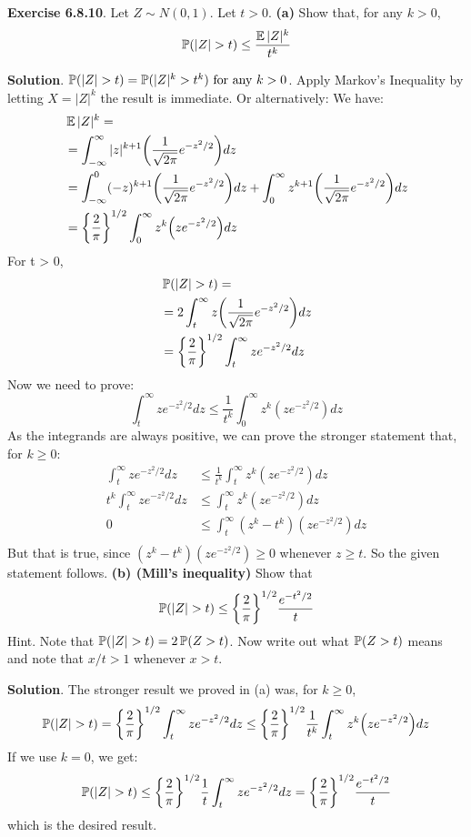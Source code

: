 \textbf{Exercise 6.8.10}. Let \(Z \sim N(0, 1)\). Let \(t > 0\).
\textbf{(a)} Show that, for any \(k > 0\),
\[
\operatorname{\mathbb{P}}(|Z| > t) \leq \frac{\operatorname{\mathbb{E}}|Z|^{k}}{t^{k}}
\]

\textbf{Solution}.
\(\PROB (|Z| > t) = \PROB
(| Z|^{k} > t^{k}) $ for any \(k > 0\).
Apply Markov's Inequality by letting \(X = |Z|^{k}\) the result is
immediate. Or alternatively:
We have:
\begin{align*}
&\EXP|Z|^{k} = \\
&= \int _{-\infty}^{\infty} |z|^{k+1}\left( \frac{1}{\sqrt{2\pi}} e^{-z^{2}/2} \right) dz \\
&= \int _{-\infty}^{0} (-z)^{k+1}\left( \frac{1}{\sqrt{2\pi}} e^{-z^{2}/2} \right) dz
  + \int _{0}^{\infty} z^{k+1}\left( \frac{1}{\sqrt{2\pi}} e^{-z^{2}/2} \right) dz \\
&=  \left\{ \frac{2}{\pi} \right\}^{1/2} \int _{0}^{\infty} z^{k} \left( z e^{-z^{2}/2} \right) dz
\end{align*}
For t > 0,
\begin{align*}
&\PROB(|Z| > t) = \\
&= 2 \int _t^{\infty} z\left( \frac{1}{\sqrt{2\pi}} e^{-z^{2}/2} \right) dz \\
&= \left\{ \frac{2}{\pi} \right\}^{1/2} \int _t^{\infty} z e^{-z^{2}/2} dz
\end{align*}
Now we need to prove:
\[
\int _t^{\infty} z e^{-z^{2}/2} dz \leq \frac{1}{t^{k}}\int _{0}^{\infty} z^{k} \left( z e^{-z^{2}/2} \right) dz
\]
As the integrands are always positive, we can prove the stronger
statement that, for \(k \geq 0\):
\begin{align*}
\int _t^{\infty} z e^{-z^{2}/2} dz & \leq \frac{1}{t^{k}}\int _{t}^{\infty} z^{k} \left( z e^{-z^{2}/2} \right) dz  \\
t^{k} \int _t^{\infty} z e^{-z^{2}/2} dz & \leq \int _{t}^{\infty} z^{k} \left( z e^{-z^{2}/2} \right) dz  \\
0 & \leq \int _{t}^{\infty} (z^{k} - t^{k}) \left( z e^{-z^{2}/2} \right) dz  \\
\end{align*}
But that is true, since \((z^{k} - t^{k}) (z e^{-z^{2}/2}) \geq 0\) whenever
\(z \geq t\). So the given statement follows.
\textbf{(b) (Mill's inequality)} Show that
\[
\PROB(|Z| > t) \leq \left\{ \frac{2}{\pi} \right\}^{1/2} \frac{e^{-t^{2}/2}}{t}
\]
Hint. Note that \(\operatorname{\mathbb{P}}(|Z| > t) = 2\operatorname{\mathbb{P}}(Z > t)\). Now write
out what \(\operatorname{\mathbb{P}}(Z > t)\) means and note that \(x/t > 1\) whenever
\(x > t\).

\textbf{Solution}.
The stronger result we proved in (a) was, for \(k \geq 0\),
\[
\PROB(|Z| > t) = \left\{ \frac{2}{\pi} \right\}^{1/2}  \int _t^{\infty} z e^{-z^{2}/2} dz \leq \left\{ \frac{2}{\pi} \right\}^{1/2} \frac{1}{t^{k}}\int _{t}^{\infty} z^{k} \left( z e^{-z^{2}/2} \right) dz
\]
If we use \(k = 0\), we get:
\[
\PROB(|Z| > t) \leq \left\{ \frac{2}{\pi} \right\}^{1/2} \frac{1}{t}\int _{t}^{\infty} z e^{-z^{2}/2} dz = \left\{ \frac{2}{\pi} \right\}^{1/2} \frac{e^{-t^{2}/2}}{t}
\]
which is the desired result.

